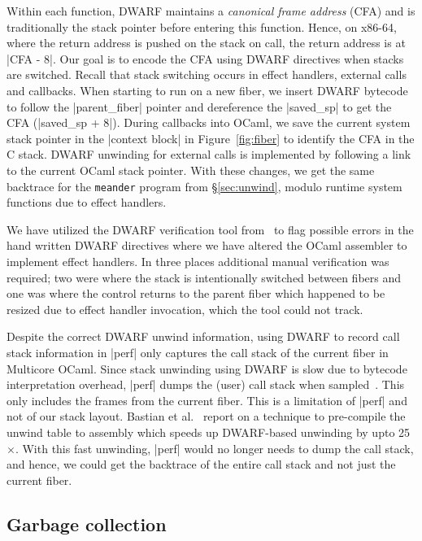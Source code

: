\documentclass[sigplan,screen]{acmart}
\begin{document}
Within each function, DWARF maintains a \emph{canonical frame address} (CFA)
and is traditionally the stack pointer before entering this function. Hence, on
x86-64, where the return address is pushed on the stack on call, the return
address is at |CFA - 8|. Our goal is to encode the CFA using DWARF directives
when stacks are switched. Recall that stack switching occurs in effect
handlers, external calls and callbacks. When starting to run on a new fiber, we
insert DWARF bytecode to follow the |parent_fiber| pointer and dereference the
|saved_sp| to get the CFA (|saved_sp + 8|). During callbacks into OCaml, we
save the current system stack pointer in the |context block| in
Figure~\ref{fig:fiber} to identify the CFA in the C stack. DWARF unwinding for
external calls is implemented by following a link to the current OCaml stack
pointer. With these changes, we get the same backtrace for the \texttt{meander}
program from \S\ref{sec:unwind}, modulo runtime system functions due to effect
handlers.

We have utilized the DWARF verification tool from~\cite{Bastian19} to flag
possible errors in the hand written DWARF directives where we have altered the
OCaml assembler to implement effect handlers. In three places additional manual
verification was required; two were where the stack is intentionally switched
between fibers and one was where the control returns to the parent fiber which
happened to be resized due to effect handler invocation, which the tool could
not track.

Despite the correct DWARF unwind information, using DWARF to record call stack
information in |perf| only captures the call stack of the current fiber in
Multicore OCaml. Since stack unwinding using DWARF is slow due to bytecode
interpretation overhead, |perf| dumps the (user) call stack when
sampled~\cite{Bastian19}. This only includes the frames from the current fiber.
This is a limitation of |perf| and not of our stack layout. Bastian et
al.~\cite{Bastian19} report on a technique to pre-compile the unwind table to
assembly which speeds up DWARF-based unwinding by upto 25$\times$. With this
fast unwinding, |perf| would no longer needs to dump the call stack, and hence,
we could get the backtrace of the entire call stack and not just the current
fiber.

\subsection{Garbage collection}
\label{sec:gc}
\end{document}
